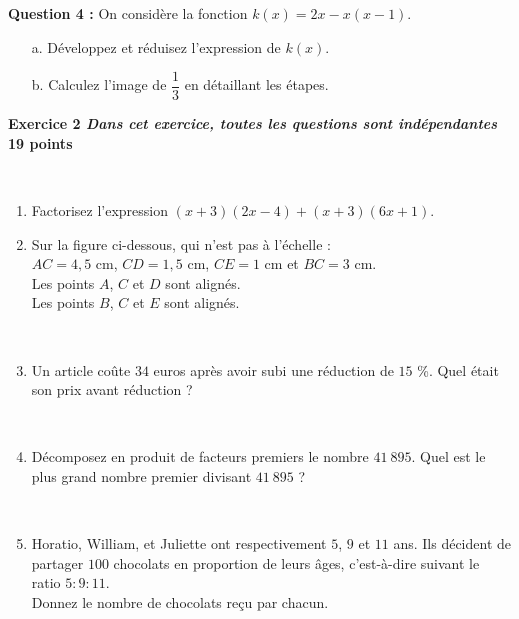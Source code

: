 \documentclass[11pt]{article}
\begin{document}
\medskip

\textbf{Question 4 :} On considère la fonction $k(x) = 2x - x(x-1)$. 
\begin{itemize}
\item[a.] Développez et réduisez l'expression de $k(x)$.
\item[b.] Calculez l'image de $\dfrac13$ en détaillant les étapes. 
\end{itemize}



\bigskip
 \newpage
 \textbf{\large{}Exercice 2 \emph{Dans cet exercice, toutes les questions sont indépendantes} \hfill 19 points}
 
 
\ \\


\begin{enumerate}
\item Factorisez l'expression $(x+3)(2x-4) + (x+3)(6x+1)$. 
\ \\
\item Sur la figure ci-dessous, qui n'est pas à l'échelle : \\$AC = 4,5$ cm, $CD = 1,5$ cm, $CE = 1$ cm et $BC = 3$ cm. \\
Les points $A$, $C$ et $D$ sont alignés. \\
Les points $B$, $C$ et $E$ sont alignés. \bigskip
\begin{figure}[H]
\end{figure}

\ \\

\item 
Un article coûte $34$ euros après avoir subi une réduction de $15$ \%. Quel était son prix avant réduction ? 

\ \\

\item Décomposez en produit de facteurs premiers le nombre $41\ 895$. Quel est le plus grand nombre premier divisant $41\ 895$ ? 


\ \\
\item Horatio, William, et Juliette ont respectivement $5$, $9$ et $11$ ans. Ils décident de partager $100$ chocolats en proportion de leurs âges, c'est-à-dire suivant le ratio $5:9:11$.\\ Donnez le nombre de chocolats reçu par chacun. 
\end{enumerate}
\end{document}
